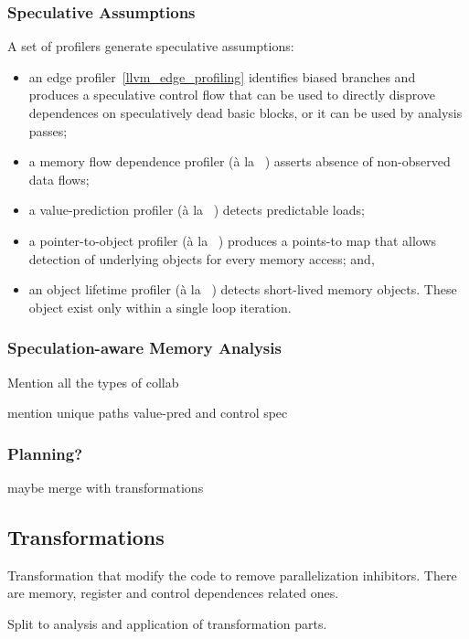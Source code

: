 \subsubsection{Speculative Assumptions}

A set of profilers generate speculative assumptions:
%
\begin{itemize}
%
\item an edge profiler~\ref{llvm_edge_profiling} identifies biased
branches and produces a speculative control flow that can be used to
directly disprove dependences on speculatively dead basic blocks, or
it can be used by analysis passes;
%
\item a memory flow dependence  profiler (\`{a} la
~\cite{privateer4citation}) asserts absence of non-observed data
flows;
%
\item a value-prediction profiler (\`{a} la
~\cite{privateer11citation}) detects predictable loads;
%
\item a pointer-to-object profiler (\`{a} la ~\cite{johnson:12:pldi})
produces a points-to map that allows detection of underlying objects
for every memory access; and,
%
\item an object lifetime profiler (\`{a} la ~\cite{johnson:12:pldi})
detects short-lived memory objects. These object exist only within a
single loop iteration.
%
\end{itemize}

\subsubsection{Speculation-aware Memory Analysis}

Mention all the types of collab

mention unique paths
value-pred and
control spec

\subsubsection{Planning?}
maybe merge with transformations

\subsection{Transformations}
\label{sec:transformations}

Transformation that modify the code to remove parallelization inhibitors.
There are memory, register and control dependences related ones.

Split to analysis and application of transformation parts.

